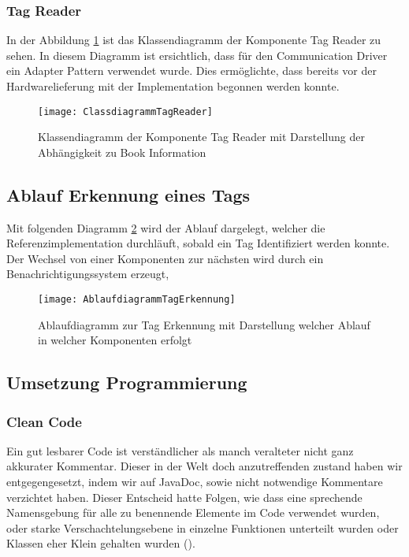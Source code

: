 \subsubsection{Tag Reader}
In der Abbildung \ref{fig:ClassTagReader} ist das Klassendiagramm der Komponente Tag Reader zu sehen.
In diesem Diagramm ist ersichtlich, dass für den Communication Driver ein Adapter Pattern verwendet wurde. Dies ermöglichte, dass bereits vor der Hardwarelieferung mit der Implementation begonnen werden konnte. 

\begin{figure}[htb]
	\centering
	\texttt{[image: ClassdiagrammTagReader]}
	\caption{Klassendiagramm der Komponente Tag Reader mit Darstellung der Abhängigkeit zu Book Information}
	\label{fig:ClassTagReader}
\end{figure}


\subsection{Ablauf Erkennung eines Tags}
Mit folgenden Diagramm \ref{fig:AblaufdiagrammTagErkennung} wird der Ablauf dargelegt, welcher die Referenzimplementation durchläuft, sobald ein Tag Identifiziert werden konnte. Der Wechsel von einer Komponenten zur nächsten wird durch ein Benachrichtigungssystem erzeugt, 
\begin{figure}[htb]
	\centering
	\texttt{[image: AblaufdiagrammTagErkennung]}
	\caption{Ablaufdiagramm zur Tag Erkennung mit Darstellung welcher Ablauf in welcher Komponenten erfolgt}
	\label{fig:AblaufdiagrammTagErkennung}
\end{figure}

\clearpage
\subsection{Umsetzung Programmierung}
\subsubsection{Clean Code}
Ein gut lesbarer Code ist verständlicher als manch veralteter nicht ganz akkurater Kommentar. Dieser in der Welt doch anzutreffenden zustand haben wir entgegengesetzt, indem wir auf JavaDoc, sowie nicht notwendige Kommentare verzichtet haben. Dieser Entscheid hatte Folgen, wie dass eine sprechende Namensgebung für alle zu benennende Elemente im Code verwendet wurden, oder starke Verschachtelungsebene in einzelne Funktionen unterteilt wurden oder Klassen eher Klein gehalten wurden (\cite{martin2009clean}).

